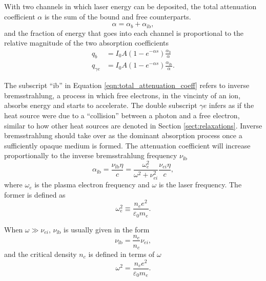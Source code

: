 With two channels in which laser energy can be deposited, the total attenuation coefficient $\alpha$ is the sum of the bound and free counterparts.
\begin{equation}
    \alpha = \alpha_b + \alpha_{\text{ib}},
    \label{eqn:total_attenuation_coeff}
\end{equation}
and the fraction of energy that goes into each channel is proportional to the relative magnitude of the two absorption coefficients
\begin{subequations}
    \begin{align}
        q_b &= I_0 A(1 - e^{-\alpha s}) \frac{\alpha_b}{\alpha} \label{eqn:heat_bound_electrons} \\
        q_{\gamma e} &= I_0 A(1 - e^{-\alpha s}) \frac{\alpha_{\text{ib}}}{\alpha}.
    \end{align}
\end{subequations}

The subscript ``ib'' in Equation \ref{eqn:total_attenuation_coeff} refers to inverse bremsstrahlung, a process in which free electrons, in the vincinty of an ion, absorbs energy and starts to accelerate. The double
subscript $\gamma e$ infers as if the heat source were due to a ``collision'' between a photon and a free electron, similar to how other heat sources are denoted in Section \ref{sect:relaxations}. Inverse bremsstrahlung
should take over as the dominant absorption process once a sufficiently opaque medium is formed. The attenuation coefficient will increase proportionally to the inverse bremsstrahlung frequency $\nu_{\text{ib}}$
\begin{equation}
    \alpha_{\text{ib}} = \frac{\nu_{\text{ib}} \eta}{c} = \frac{\omega_e^2}{\omega^2 + \nu_{ei}^2} \frac{\nu_{ei} \eta}{c},
    \label{eqn:nu_ib_general}
\end{equation}
where $\omega_e$ is the plasma electron frequency and $\omega$ is the laser frequency. The former is defined as
\begin{equation}
    \omega_e^2 \equiv \frac{n_e e^2}{\varepsilon_0 m_e}.
\end{equation}

When $\omega \gg \nu_{ei}$, $\nu_{\text{ib}}$ is usually given in the form
\begin{equation}
    \nu_{\text{ib}} = \frac{n_e}{n_c} \nu_{ei},
    \label{eqn:nu_ib_approx}
\end{equation}
and the critical density $n_c$ is defined in terms of $\omega$
\begin{equation}
    \omega^2 = \frac{n_c e^2}{\varepsilon_0 m_e}.
\end{equation}

